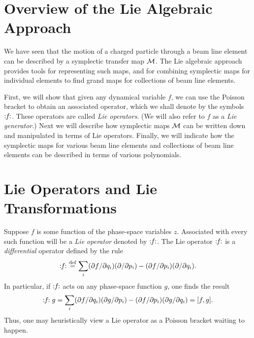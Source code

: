 \section{Overview of the Lie Algebraic Approach}
\label{overview}
     We have seen that the motion of a charged particle through a beam line
element can be described by a symplectic transfer map ${\cal M}$.  The Lie algebraic
approach provides tools for representing such maps, and for combining
symplectic maps for individual elements to find grand maps for collections
of beam line elements.

     First, we will show that given any dynamical variable $f$, we can use
the Poisson bracket to obtain an associated operator, which we shall denote
by the symbols $\Lieop(f)$.  These operators are called {\em Lie operators}.  (We will also refer to $f$ as a {\em Lie generator}.)   Next we
will describe how symplectic maps ${\cal M}$ can be written down and manipulated in
terms of Lie operators.  Finally, we will indicate how the symplectic maps
for various beam line elements and collections of beam line elements can be
described in terms of various polynomials.

\section{Lie Operators and Lie Transformations}
\label{lieop}
     Suppose $f$ is some function of the phase-space variables $z$.  Associated
with every such function will be a {\em Lie operator} denoted by
$\Lieop(f)$.  The Lie
operator $\Lieop(f)$ is a {\em differential} operator defined by the rule
\begin{equation}
           \Lieop(f) \ \stackrel{\rm def}{=} \sum_i (\partial f/\partial
		   q_i) (\partial /\partial p_i) - (\partial f/\partial p_i)(\partial
		   /\partial q_i).
\end{equation}
In particular, if $\Lieop(f)$ acts on any phase-space function $g$, one
finds the result
\begin{equation}
           \Lieop(f)g = \sum_i (\partial f/\partial
		   q_i) (\partial g/\partial p_i) - (\partial f/\partial p_i)(\partial
		   g/\partial q_i) = [f,g].
\end{equation}
Thus, one may heuristically view a Lie operator as a Poisson bracket
waiting to happen.

